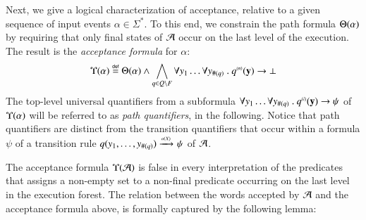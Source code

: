 Next, we give a logical characterization of acceptance, relative to a
given sequence of input events $\alpha \in \Sigma^*$. To this end, we
constrain the path formula $\Theta({\alpha})$ by requiring that only
final states of $\mathcal{A}$ occur on the last level of the execution.  The
result is the \emph{acceptance formula} for $\alpha$:
\begin{equation}\label{eq:accform}
\Upsilon({\alpha}) \stackrel{\scriptscriptstyle{\mathsf{def}}}{=} \Theta({\alpha}) \wedge \bigwedge_{q
  \in Q \setminus F} \forall y_1 \ldots \forall y_{\#(q)} ~.~
{q}^{\scriptscriptstyle{({n})}}(\mathbf y) \rightarrow \bot
\end{equation}
The top-level universal quantifiers from a subformula $\forall y_1
\ldots \forall y_{\#(q)} ~.~ {q}^{\scriptscriptstyle{({i})}}(\mathbf y) \rightarrow \psi$
of $\Upsilon({\alpha})$ will be referred to as \emph{path quantifiers},
in the following. Notice that path quantifiers are distinct from the
transition quantifiers that occur within a formula $\psi$ of a
transition rule $q(y_1,\ldots,y_{\#(q)}) \xrightarrow{{\scriptscriptstyle a(X)}}_{{\scriptstyle }} \psi$ of $\mathcal{A}$.

The acceptance formula $\Upsilon({\mathcal{A}})$ is false in every interpretation
of the predicates that assigns a non-empty set to a non-final
predicate occurring on the last level in the execution forest. The
relation between the words accepted by $\mathcal{A}$ and the acceptance formula
above, is formally captured by the following lemma:

